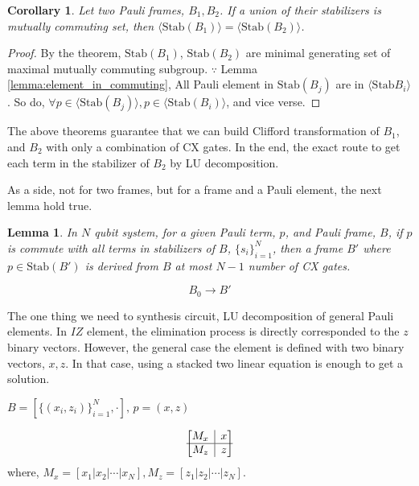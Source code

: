 \documentclass[a4paper,12pt]{article}
\newcommand{\rvline}{\hspace*{-\arraycolsep}\vline\hspace*{-\arraycolsep}}
\newtheorem{lemma}{Lemma}
\newtheorem{corollary}{Corollary}
\begin{document}
\begin{corollary}
    Let two Pauli frames, $B_1, B_2$. 
    If a union of their stabilizers is mutually commuting set,
    then $\langle \mbox{Stab}(B_1) \rangle = \langle \mbox{Stab}(B_2) \rangle$.
\end{corollary}
\begin{proof}  
    By the theorem, $\mbox{Stab}(B_1)$, $\mbox{Stab}(B_2)$ are minimal generating set of maximal mutually commuting subgroup. 
    $\because$ Lemma \ref{lemma:element_in_commuting}, All Pauli element in $\mbox{Stab}(B_j)$ are in $\langle \mbox{Stab}{B_i} \rangle$.
So do, $\forall p \in \langle \mbox{Stab}(B_j)\rangle, p \in \langle \mbox{Stab}(B_i)\rangle$, and vice verse. 
\end{proof}

The above theorems guarantee that we can build Clifford transformation
of $B_1$, and $B_2$ with only a combination of CX gates. 
In the end, the exact route to get each term in the stabilizer of $B_2$
by LU decomposition.

As a side, not for two frames, but for a frame and a Pauli element, the next lemma hold true.

\begin{lemma}
    In $N$ qubit system, for a given Pauli term, $p$, and Pauli frame, $B$,
    if $p$ is commute with all terms in stabilizers of $B$, $\{s_i\}_{i=1}^N$,
    then a frame $B'$ where $p \in \mbox{Stab}(B')$ is derived 
    from $B$ at most $N-1$ number of CX gates.
    
    \begin{equation}
        B_0 \rightarrow B'
    \end{equation}
\end{lemma}

The one thing we need to synthesis circuit, LU decomposition of 
general Pauli elements. In $IZ$ element, the elimination process is 
directly corresponded to the $z$ binary vectors.
However, the general case the element is defined with two binary vectors, $x, z$.
In that case, using a stacked two linear equation is enough to get a solution.

$B = [\{(x_i, z_i)\}_{i=1}^N, \cdot], \, p = (x, z)$

\begin{equation}
    \begin{bmatrix}
        M_x & \rvline & x\\
        \hline
        M_z & \rvline & z\\
    \end{bmatrix}
\end{equation}
where, $M_x = [x_1| x_2 | \cdots | x_N], M_z = [z_1| z_2 | \cdots | z_N]$.
\end{document}
